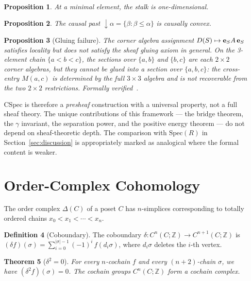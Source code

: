 \documentclass[11pt,a4paper]{article}
\theoremstyle{plain}
\newtheorem{theorem}{Theorem}[section]
\newtheorem{proposition}[theorem]{Proposition}
\theoremstyle{definition}
\newtheorem{definition}[theorem]{Definition}
\theoremstyle{remark}
\newcommand{\CSpec}{\mathrm{CSpec}}
\newcommand{\Spec}{\mathrm{Spec}}
\newcommand{\Z}{\mathbb{Z}}
\begin{document}
\begin{proposition}
At a minimal element, the stalk is one-dimensional.
\end{proposition}

\begin{proposition}
The causal past ${\downarrow}\alpha = \{\beta : \beta \leq \alpha\}$ is causally convex.
\end{proposition}

\begin{proposition}[Gluing failure]\label{prop:gluing}
The corner algebra assignment $D(S) \mapsto {\bf e}_S A\, {\bf e}_S$
satisfies locality but does \emph{not} satisfy the sheaf gluing axiom
in general. On the 3-element chain $\{a < b < c\}$, the sections
over $\{a, b\}$ and $\{b, c\}$ are each $2 \times 2$ corner algebras,
but they cannot be glued into a section over $\{a, b, c\}$: the
cross-entry $M(a, c)$ is determined by the full $3 \times 3$ algebra
and is not recoverable from the two $2 \times 2$ restrictions.
Formally verified~\cite{leanrepo}.
\end{proposition}

\noindent
$\CSpec$ is therefore a \emph{presheaf} construction with a universal
property, not a full sheaf theory. The unique contributions of this
framework --- the bridge theorem, the $\gamma$ invariant, the
separation power, and the positive energy theorem --- do not depend
on sheaf-theoretic depth. The comparison with $\Spec(R)$ in
Section~\ref{sec:discussion} is appropriately marked as analogical
where the formal content is weaker.


\section{Order-Complex Cohomology}\label{sec:cohomology}

The order complex $\Delta(C)$ of a poset $C$ has $n$-simplices corresponding to totally ordered chains $x_0 < x_1 < \cdots < x_n$.

\begin{definition}[Coboundary]
The coboundary $\delta : C^n(C;\Z) \to C^{n+1}(C;\Z)$ is
$(\delta f)(\sigma) = \sum_{i=0}^{|\sigma|-1} (-1)^i\, f(d_i \sigma)$,
where $d_i\sigma$ deletes the $i$-th vertex.
\end{definition}

\begin{theorem}[$\delta^2 = 0$]
For every $n$-cochain $f$ and every $(n{+}2)$-chain $\sigma$, we have $(\delta^2 f)(\sigma) = 0$.
The cochain groups $C^n(C;\Z)$ form a cochain complex.
\end{theorem}
\end{document}
